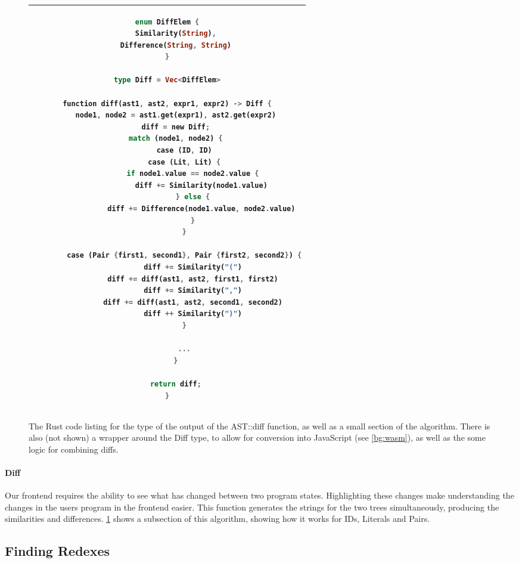 \begin{figure}[t]
    \centering
    \begin{tabular}{|c|}
        \hline
    \begin{lstlisting}[language=Rust]
enum DiffElem {
    Similarity(String),
    Difference(String, String)
}

type Diff = Vec<DiffElem>

function diff(ast1, ast2, expr1, expr2) -> Diff {
    node1, node2 = ast1.get(expr1), ast2.get(expr2)
    diff = new Diff;
    match (node1, node2) {
        case (ID, ID)
        case (Lit, Lit) {
            if node1.value == node2.value {
                diff += Similarity(node1.value)
            } else {
                diff += Difference(node1.value, node2.value)
            }
        }

        case (Pair {first1, second1}, Pair {first2, second2}) {
            diff += Similarity("(")
            diff += diff(ast1, ast2, first1, first2)
            diff += Similarity(",")
            diff += diff(ast1, ast2, second1, second2)
            diff ++ Similarity(")")
        }

        ...
    }
    
    return diff;
}
    \end{lstlisting}
    \\\hline
    \end{tabular}
    \caption{The Rust code listing for the type of the output of the AST::diff function, as well as a small section of the algorithm. There is also (not shown) a wrapper around the Diff type, to allow for conversion into JavaScript (see \ref{bg:wasm}), as well as the some logic for combining diffs.}
    \label{fig:diff_list}
\end{figure}

\paragraph{Diff} \label{paragraph:diff} Our frontend requires the ability to see what has changed between two program states. Highlighting these changes make understanding the changes in the users program in the frontend easier. This function generates the strings for the two trees simultaneously, producing the similarities and differences. \ref{fig:diff_list} shows a subsection of this algorithm, showing how it works for IDs, Literals and Pairs.

\subsection{Finding Redexes}

